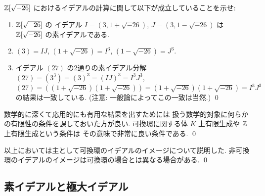 \documentclass[12pt,twoside]{jarticle}
\begin{document}
\begin{question}[20点以上]
 ${\mathbb Z}[\sqrt{-26}]$ におけるイデアルの計算に関して以下が成立していることを示せ:
 \begin{enumerate}
  \item ${\mathbb Z}[\sqrt{-26}]$ の
   イデアル $I=(3,1+\sqrt{-26})$, $J=(3,1-\sqrt{-26})$ は %
   ${\mathbb Z}[\sqrt{-26}]$ の素イデアルである.
  \item $(3)=IJ$, $(1+\sqrt{-26})=I^3$, $(1-\sqrt{-26})=J^3$.
  \item イデアル $(27)$ の2通りの素イデアル分解 %
   $(27)=(3^3)=(3)^3=(IJ)^3=I^3J^3$, %
   $(27)=((1+\sqrt{-26})(1+\sqrt{-26}))=(1+\sqrt{-26})(1+\sqrt{-26})=I^3J^3$ %
   の結果は一致している.
   (注意: 一般論によってこの一致は当然.)
   \qed
 \end{enumerate}
\end{question}

\begin{guide}
 数学的に深くて応用的にも有用な結果を出すためには
 扱う数学的対象に何らかの有限性の条件を課しておいた方が良い.
 可換環に関する体 $K$ 上有限生成や ${\mathbb Z}$ 上有限生成という条件は
 その意味で非常に良い条件である.
 \qed
\end{guide}

\begin{guide}
 以上においては主として可換環のイデアルのイメージについて説明した.
 非可換環のイデアルのイメージは可換環の場合とは異なる場合がある.
 \qed
\end{guide}

\subsection{素イデアルと極大イデアル}
\end{document}
